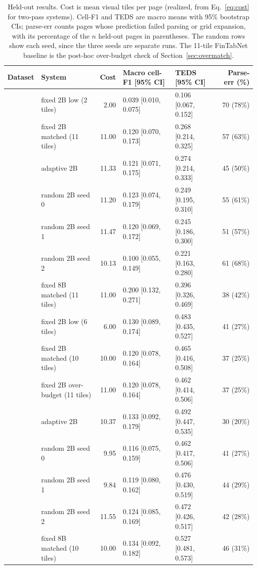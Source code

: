 \documentclass[conference]{IEEEtran}
\begin{document}
\begin{table}[t]
  \centering
  \caption{Held-out results. Cost is mean visual tiles per page
  (realized, from Eq.~\ref{eq:cost} for two-pass systems). Cell-F1 and
  TEDS are macro means with 95\% bootstrap CIs; parse-err counts pages
  whose prediction failed parsing or grid expansion, with its percentage
  of the $n$ held-out pages in parentheses. The random rows
  show each seed, since the three seeds are separate runs. The 11-tile
  FinTabNet baseline is the post-hoc over-budget check of
  Section~\ref{sec:overmatch}.}
  \label{tab:main}
  \small
  \begin{tabular}{llrllr}
  \toprule
  Dataset & System & Cost & Macro cell-F1 [95\% CI] & TEDS [95\% CI] & Parse-err (\%) \\
  \midrule
   & fixed 2B low (2 tiles)      &  2.00 & 0.039 [0.010, 0.075] & 0.106 [0.067, 0.152] & 70 (78\%) \\
   & fixed 2B matched (11 tiles) & 11.00 & 0.120 [0.070, 0.173] & 0.268 [0.214, 0.325] & 57 (63\%) \\
   & adaptive 2B                 & 11.33 & 0.121 [0.071, 0.175] & 0.274 [0.214, 0.333] & 45 (50\%) \\
   & random 2B seed 0            & 11.20 & 0.123 [0.074, 0.179] & 0.249 [0.195, 0.310] & 55 (61\%) \\
   & random 2B seed 1            & 11.47 & 0.120 [0.069, 0.172] & 0.245 [0.186, 0.300] & 51 (57\%) \\
   & random 2B seed 2            & 10.13 & 0.100 [0.055, 0.149] & 0.221 [0.163, 0.280] & 61 (68\%) \\
   & fixed 8B matched (11 tiles) & 11.00 & 0.200 [0.132, 0.271] & 0.396 [0.326, 0.469] & 38 (42\%) \\
  \midrule
   & fixed 2B low (6 tiles)      &  6.00 & 0.130 [0.089, 0.174] & 0.483 [0.435, 0.527] & 41 (27\%) \\
   & fixed 2B matched (10 tiles) & 10.00 & 0.120 [0.078, 0.164] & 0.465 [0.416, 0.508] & 37 (25\%) \\
   & fixed 2B over-budget (11 tiles) & 11.00 & 0.120 [0.078, 0.164] & 0.462 [0.414, 0.506] & 37 (25\%) \\
   & adaptive 2B                 & 10.37 & 0.133 [0.092, 0.179] & 0.492 [0.447, 0.535] & 30 (20\%) \\
   & random 2B seed 0            &  9.95 & 0.116 [0.075, 0.159] & 0.462 [0.417, 0.506] & 41 (27\%) \\
   & random 2B seed 1            &  9.84 & 0.119 [0.080, 0.162] & 0.476 [0.430, 0.519] & 44 (29\%) \\
   & random 2B seed 2            & 11.55 & 0.124 [0.085, 0.169] & 0.472 [0.426, 0.517] & 42 (28\%) \\
   & fixed 8B matched (10 tiles) & 10.00 & 0.134 [0.092, 0.182] & 0.527 [0.481, 0.573] & 46 (31\%) \\
  \bottomrule
  \end{tabular}
\end{table}
\end{document}
